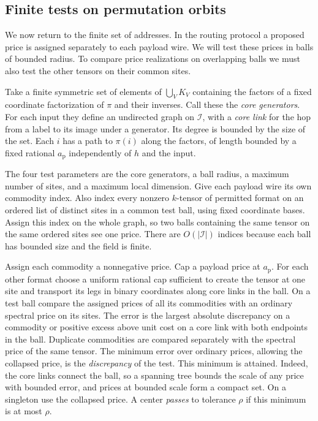 \subsection{Finite tests on permutation orbits}

We now return to the finite set of addresses. In the routing protocol
a proposed price is assigned separately to each payload wire. We will
test these prices in balls of bounded radius. To compare price
realizations on overlapping balls we must also test the other tensors
on their common sites.

Take a finite symmetric set of elements of $\bigcup_V K_V$ containing
the factors of a fixed coordinate factorization of $\pi$ and their
inverses. Call these the \emph{core generators}. For each input they
define an undirected graph on $\mathcal I$, with a \emph{core link}
for the hop from a label to its image under a generator. Its degree
is bounded by the size of the set. Each $i$ has a path to $\pi(i)$
along the factors, of length bounded by a fixed rational $a_{\mathrm p}$
independently of $h$ and the input.

The four test parameters are the core generators, a ball radius,
a maximum number of sites, and a maximum local dimension. Give each
payload wire its own commodity index. Also index every nonzero $k$-tensor
of permitted format on an ordered list of distinct sites in a common
test ball, using fixed coordinate bases. Assign this index on the
whole graph, so two balls containing the same tensor on the same
ordered sites see one price. There are $O(|\mathcal I|)$ indices
because each ball has bounded size and the field is finite.

Assign each commodity a nonnegative price. Cap a payload price at
$a_{\mathrm p}$. For each other format choose a uniform rational cap
sufficient to create the tensor at one site and transport its legs in
binary coordinates along core links in the ball. On a test ball compare
the assigned prices of all its commodities with an ordinary spectral
price on its sites. The error is the largest absolute discrepancy on a
commodity or positive excess above unit cost on a core link with both
endpoints in the ball. Duplicate commodities are compared separately
with the spectral price of the same tensor. The minimum error over ordinary prices, allowing the collapsed price,
is the \emph{discrepancy} of the test. This minimum is attained.
Indeed, the core links connect the ball, so a spanning tree bounds
the scale of any price with bounded error, and prices at bounded scale
form a compact set. On a singleton use the collapsed price. A center
\emph{passes} to tolerance $\rho$ if this minimum is at most $\rho$.

